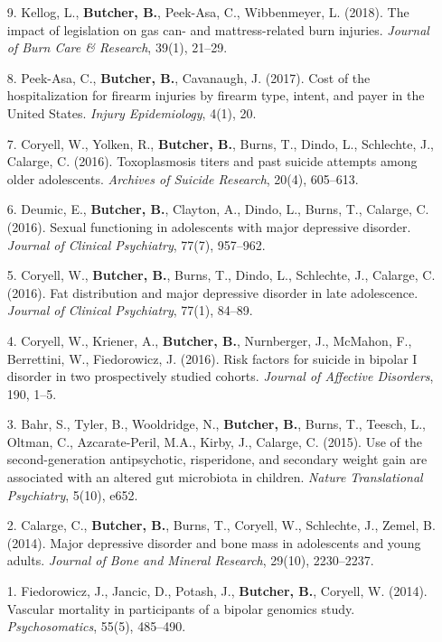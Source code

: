 \documentclass[a4paper]{article}
\begin{document}
\begin{enumerate}
  \item[9.] Kellog, L., \textbf{Butcher, B.}, Peek-Asa, C., Wibbenmeyer, L. (2018).
    The impact of legislation on gas can- and mattress-related
    burn injuries. \textit{Journal of Burn Care \& Research}, 39(1), 21--29.

  \item[8.] Peek-Asa, C., \textbf{Butcher, B.}, Cavanaugh, J. (2017). Cost of the
    hospitalization for firearm injuries by firearm type, intent, and
    payer in the United States. \textit{Injury Epidemiology}, 4(1), 20.

  \item[7.] Coryell, W., Yolken, R., \textbf{Butcher, B.}, Burns, T., Dindo, L., Schlechte,
    J., Calarge, C. (2016). Toxoplasmosis titers and past suicide attempts among
    older adolescents. \textit{Archives of Suicide Research}, 20(4), 605--613.

  \item[6.] Deumic, E., \textbf{Butcher, B.}, Clayton, A., Dindo, L., Burns, T., Calarge,
    C. (2016). Sexual functioning in adolescents with major depressive disorder.
    \textit{Journal of Clinical Psychiatry}, 77(7), 957--962.

  \item[5.] Coryell, W., \textbf{Butcher, B.}, Burns, T., Dindo, L., Schlechte, J.,
    Calarge, C. (2016). Fat distribution and major depressive disorder in
    late adolescence. \textit{Journal of Clinical Psychiatry}, 77(1), 84--89.

  \item[4.] Coryell, W., Kriener, A., \textbf{Butcher, B.}, Nurnberger, J., McMahon, F.,
    Berrettini, W., Fiedorowicz, J. (2016). Risk factors for suicide in bipolar
    I disorder in two prospectively studied cohorts. \textit{Journal of Affective
    Disorders}, 190, 1--5.

  \item[3.] Bahr, S., Tyler, B., Wooldridge, N., \textbf{Butcher, B.}, Burns, T., Teesch, L.,
    Oltman, C., Azcarate-Peril, M.A., Kirby, J., Calarge, C. (2015). Use of the
    second-generation antipsychotic, risperidone, and secondary weight gain are
    associated with an altered gut microbiota in children.
    \textit{Nature Translational Psychiatry}, 5(10), e652.

  \item[2.] Calarge, C., \textbf{Butcher, B.}, Burns, T., Coryell, W., Schlechte, J., Zemel,
    B. (2014). Major depressive disorder and bone mass in adolescents and young
    adults. \textit{Journal of Bone and Mineral Research}, 29(10), 2230--2237.

  \item[1.] Fiedorowicz, J., Jancic, D., Potash, J., \textbf{Butcher, B.}, Coryell, W.
    (2014). Vascular mortality in participants of a bipolar genomics study.
    \textit{Psychosomatics}, 55(5), 485--490.

\end{enumerate}
\end{document}
